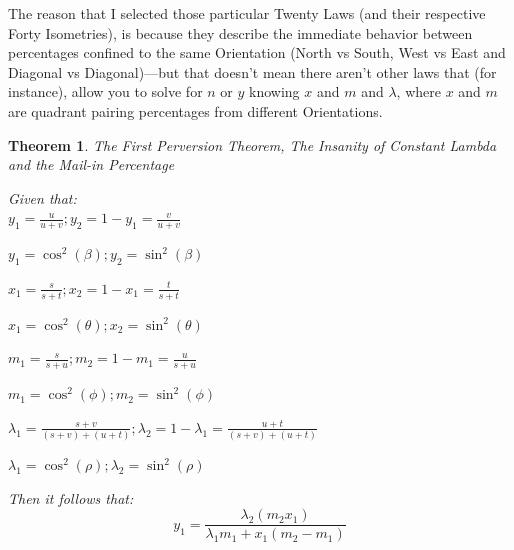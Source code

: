 \documentclass[preprint,13pt]{elsarticle}
\newtheorem{theorem}{Theorem}[section]
\begin{document}
The reason that I selected those particular Twenty Laws (and their respective Forty Isometries), is because they describe the immediate behavior between percentages confined to the same Orientation (North vs South, West vs East and Diagonal vs Diagonal)---but that doesn't mean there aren't other laws that (for instance), allow you to solve for $n$ or $y$ knowing $x$ and $m$ and $\lambda$, where $x$ and $m$ are quadrant pairing percentages from different Orientations.
\newpage
\begin{theorem}{The First Perversion Theorem, The Insanity of Constant Lambda and the Mail-in Percentage}

Given that:\\
$y_{1}=\frac{u}{u+v};y_{2}=1-y_{1}=\frac{v}{u+v}$

$y_{1}=\cos^{2}(\beta); y_{2}=\sin^{2}(\beta)$

$x_{1}=\frac{s}{s+t};x_{2}=1-x_{1}=\frac{t}{s+t}$

$x_{1}=\cos^{2}(\theta); x_{2}=\sin^{2}(\theta)$

$m_{1}=\frac{s}{s+u};m_{2}=1-m_{1}=\frac{u}{s+u}$

$m_{1}=\cos^{2}(\phi); m_{2}=\sin^{2}(\phi)$

$\lambda_{1}=\frac{s+v}{(s+v)+(u+t)};\lambda_{2}=1-\lambda_{1}=\frac{u+t}{(s+v)+(u+t)}$

$\lambda_{1}=\cos^{2}(\rho); \lambda_{2}=\sin^{2}(\rho)$

Then it follows that:
$$y_{1}=\frac{\lambda_{2}(m_{2}x_{1})}{\lambda_{1}m_{1}+x_{1}(m_{2}-m_{1})}$$


\end{theorem}
\end{document}
